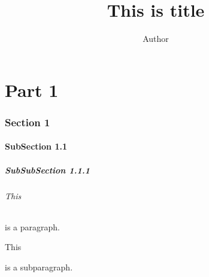 \documentclass{article}
\title{This is title}
\author{Author}
\begin{document}
\maketitle
\tableofcontents
\newpage
\part{Part 1}
\section{Section 1}
\subsection{SubSection 1.1}
\subsubsection{SubSubSection 1.1.1}
\paragraph{This} is a paragraph.
\subparagraph{This} is a subparagraph.
\end{document}
